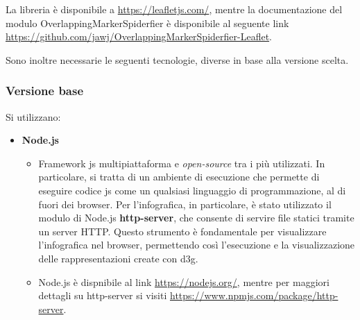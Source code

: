 La libreria è disponibile a \href{https://leafletjs.com/}{https://leafletjs.com/}, mentre la documentazione del modulo OverlappingMarkerSpiderfier è disponibile al seguente link \\
\href{https://github.com/jawj/OverlappingMarkerSpiderfier-Leaflet}{https://github.com/jawj/OverlappingMarkerSpiderfier-Leaflet}.

\bigskip
\noindent Sono inoltre necessarie le seguenti tecnologie, diverse in base alla versione scelta.
\subsubsection{Versione base}
Si utilizzano:
\begin{itemize}
    \item \textbf{Node.js} 
    \begin{itemize} 
        \item Framework \gls{js} multipiattaforma e \emph{open-source} tra i più utilizzati. In particolare, si tratta di un ambiente di esecuzione che permette di eseguire codice \gls{js} 
        come un qualsiasi linguaggio di programmazione, al di fuori dei browser. 
        Per l'infografica, in particolare, è stato utilizzato il modulo di Node.js \textbf{http-server}, che consente di servire file statici tramite un server HTTP. Questo strumento è fondamentale per 
        visualizzare l'infografica nel browser, permettendo così l'esecuzione e la visualizzazione delle rappresentazioni create con \gls{d3g}.
        
        \item Node.js è dispnibile al link \href{https://nodejs.org/}{https://nodejs.org/}, mentre per maggiori dettagli su http-server si visiti \href{https://www.npmjs.com/package/http-server}{https://www.npmjs.com/package/http-server}.
    \end{itemize}
\end{itemize}

